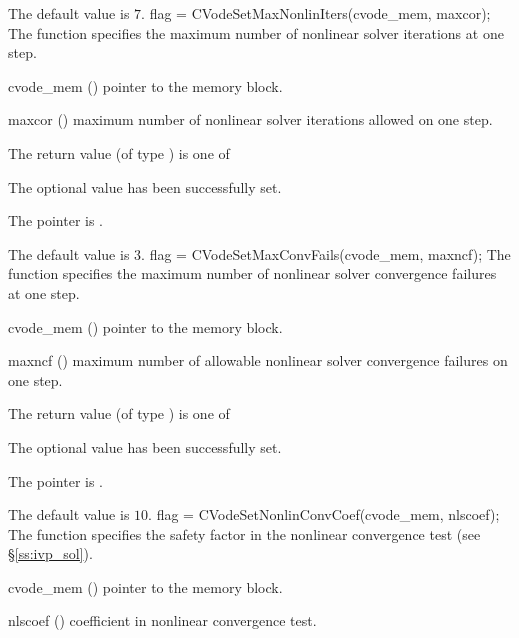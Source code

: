 {
  The default value is $7$.
}
{
flag = CVodeSetMaxNonlinIters(cvode\_mem, maxcor);
}
{
  The function  specifies the maximum
  number of nonlinear solver iterations at one step.
}
{
  \begin{args}
  \item[cvode\_mem] ()
    pointer to the {\cvode} memory block.
  \item[maxcor] ()
    maximum number of nonlinear solver iterations allowed on one step.
  \end{args}
}
{
  The return value  (of type ) is one of
  \begin{args}
  \item[\Id{CV\_SUCCESS}] 
    The optional value has been successfully set.
  \item[\Id{CV\_MEM\_NULL}]
    The  pointer is .
  \end{args}
}
{
  The default value is $3$.
}
{
flag = CVodeSetMaxConvFails(cvode\_mem, maxncf);
}
{
  The function  specifies the
  maximum number of nonlinear solver convergence failures at one step.
}
{
  \begin{args}
  \item[cvode\_mem] ()
    pointer to the {\cvode} memory block.
  \item[maxncf] ()
    maximum number of allowable nonlinear solver convergence failures
    on one step.
  \end{args}
}
{
  The return value  (of type ) is one of
  \begin{args}
  \item[\Id{CV\_SUCCESS}] 
    The optional value has been successfully set.
  \item[\Id{CV\_MEM\_NULL}]
    The  pointer is .
  \end{args}
}
{
  The default value is $10$.
}
{
flag = CVodeSetNonlinConvCoef(cvode\_mem, nlscoef);
}
{
  The function  specifies the safety factor
  in the nonlinear convergence test (see \S\ref{ss:ivp_sol}).
}
{
  \begin{args}
  \item[cvode\_mem] ()
    pointer to the {\cvode} memory block.
  \item[nlscoef] ()
    coefficient in nonlinear convergence test.
  \end{args}
}
